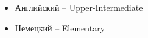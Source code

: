






\begin{itemize}
	\item Английский -- Upper-Intermediate
    \item Немецкий -- Elementary
\end{itemize}

